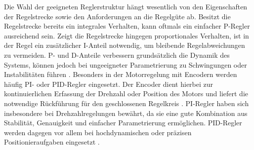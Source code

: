 Die Wahl der geeigneten Reglerstruktur hängt wesentlich von den Eigenschaften der Regelstrecke sowie den Anforderungen an die Regelgüte ab. Besitzt die Regelstrecke bereits ein integrales Verhalten, kann oftmals ein einfacher P-Regler ausreichend sein. Zeigt die Regelstrecke hingegen proportionales Verhalten, ist in der Regel ein zusätzlicher I-Anteil notwendig, um bleibende Regelabweichungen zu vermeiden. P- und D-Anteile verbessern grundsätzlich die Dynamik des Systems, können jedoch bei ungeeigneter Parametrierung zu Schwingungen oder Instabilitäten führen \cite{Lunze:2020}.
Besonders in der Motorregelung mit Encodern werden häufig PI- oder PID-Regler eingesetzt. Der Encoder dient hierbei zur kontinuierlichen Erfassung der Drehzahl oder Position des Motors und liefert die notwendige Rückführung für den geschlossenen Regelkreis \cite{Ibrahim:2023}. PI-Regler haben sich insbesondere bei Drehzahlregelungen bewährt, da sie eine gute Kombination aus Stabilität, Genauigkeit und einfacher Parametrierung ermöglichen. PID-Regler werden dagegen vor allem bei hochdynamischen oder präzisen Positionieraufgaben eingesetzt \cite{Lunze:2020}. 

